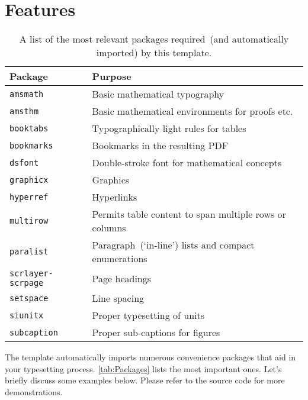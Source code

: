 \section{Features}

\begin{table}
  \centering
  \begin{tabular}{ll}
    \toprule
    \textbf{Package}      & \textbf{Purpose}\\
    \midrule
      \texttt{amsmath}          & Basic mathematical typography\\
      \texttt{amsthm}           & Basic mathematical environments for proofs etc.\\
      \texttt{booktabs}         & Typographically light rules for tables\\
      \texttt{bookmarks}        & Bookmarks in the resulting PDF\\
      \texttt{dsfont}           & Double-stroke font for mathematical concepts\\
      \texttt{graphicx}         & Graphics\\
      \texttt{hyperref}         & Hyperlinks\\
      \texttt{multirow}         & Permits table content to span multiple rows or columns\\ 
      \texttt{paralist}         & Paragraph~(`in-line') lists and compact enumerations\\
      \texttt{scrlayer-scrpage} & Page headings\\
      \texttt{setspace}         & Line spacing\\
      \texttt{siunitx}          & Proper typesetting of units\\
      \texttt{subcaption} & Proper sub-captions for figures\\
    \bottomrule
  \end{tabular}
  \caption{%
    A list of the most relevant packages required~(and automatically imported) by this template.
  }
  \label{tab:Packages}
\end{table}

The template automatically imports numerous convenience packages that
aid in your typesetting process. \autoref{tab:Packages} lists the
most important ones. Let's briefly discuss some examples below. Please
refer to the source code for more demonstrations.

